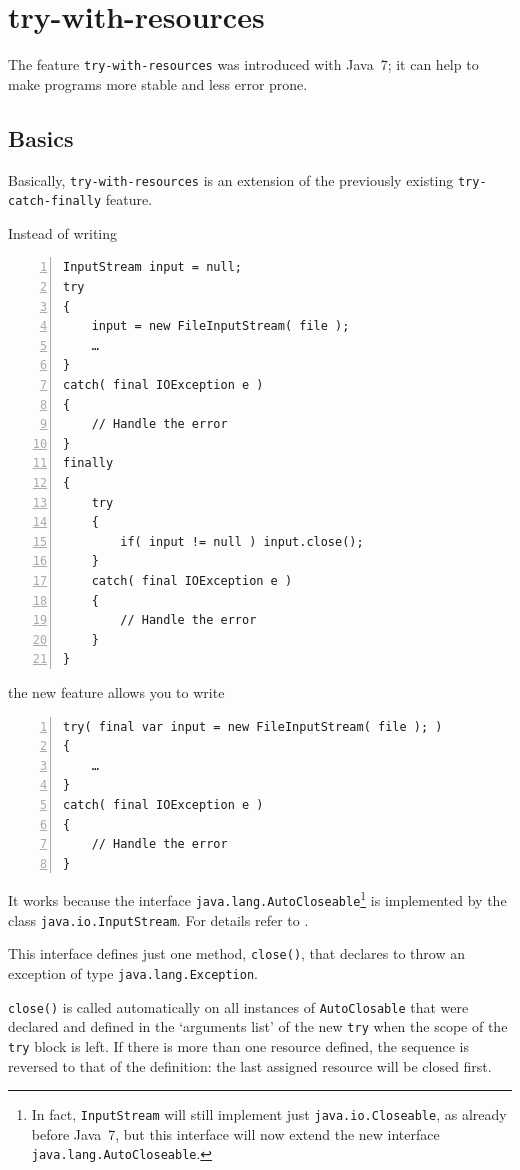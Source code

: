 \documentclass[11pt,a4paper, titlepage, parskip=half, headsepline, footsepline, cleardoublepage=current, headheight=1cm]{scrbook}
\begin{document}
\section{try-with-resources}\label{sec:TryWithResources}
The feature \lstinline|try-with-resources| was introduced with Java~7; it can help to make programs more stable and less error prone.

\subsection{Basics}
Basically, \lstinline|try-with-resources| is an extension of the previously existing \lstinline|try-catch-finally| feature.

Instead of writing
\begin{lstlisting}[numbers=left]
InputStream input = null;
try
{
    input = new FileInputStream( file );
    …
}
catch( final IOException e )
{
    // Handle the error
}
finally
{
    try
    {
        if( input != null ) input.close();
    }
    catch( final IOException e )
    {
        // Handle the error
    }
}
\end{lstlisting}

the new feature allows you to write

\begin{lstlisting}[numbers=left]
try( final var input = new FileInputStream( file ); )
{
    …
}
catch( final IOException e )
{
    // Handle the error
}
\end{lstlisting}

It works because the interface \lstinline|java.lang.AutoCloseable|\footnote{In fact, \lstinline|InputStream| will still implement just \lstinline|java.io.Closeable|, as already before Java~7, but this interface will now extend the new interface \lstinline|java.lang.AutoCloseable|.} is implemented by the class \lstinline|java.io.InputStream|. For details refer to \autocite{ORACLE_DOC_AUTOCLOSEABLE_INTERFACE}.

This interface defines just one method, \lstinline|close()|, that declares to throw an exception of type \lstinline|java.lang.Exception|.

\lstinline|close()| is called automatically on all instances of \lstinline|AutoClosable| that were declared and defined in the ‘arguments list’ of the new \lstinline|try| when the scope of the \lstinline|try| block is left. If there is more than one resource defined, the sequence is reversed to that of the definition: the last assigned resource will be closed first.
\end{document}
